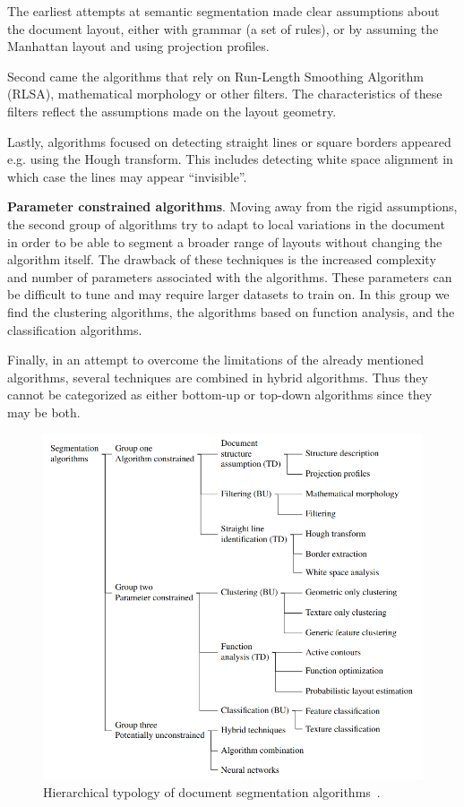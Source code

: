 \documentclass[english, bibtex]{kththesis}
\begin{document}
The earliest attempts at semantic segmentation made clear assumptions about the document layout, either with grammar (a set of rules), or by assuming the Manhattan layout and using projection profiles.
    
Second came the algorithms that rely on Run-Length Smoothing Algorithm (RLSA), mathematical morphology or other filters. The characteristics of these filters reflect the assumptions made on the layout geometry. 
    
Lastly, algorithms focused on detecting straight lines or square borders appeared e.g. using the Hough transform. This includes detecting white space alignment in which case the lines may appear “invisible”.
    
\textbf{Parameter constrained algorithms}. Moving away from the rigid assumptions, the second group of algorithms try to adapt to local variations in the document in order to be able to segment a broader range of layouts without changing the algorithm itself. The drawback of these techniques is the increased complexity and number of parameters associated with the algorithms. These parameters can be difficult to tune and may require larger datasets to train on. In this group we find the clustering algorithms, the algorithms based on function analysis, and the classification algorithms. 

Finally, in an attempt to overcome the limitations of the already mentioned algorithms, several techniques are combined in hybrid algorithms. Thus they cannot be categorized as either bottom-up or top-down algorithms since they may be both.  

\begin{figure}[H]
  \begin{center}
    \includegraphics[width=1.0\textwidth]{figures/classicalalgs.png}
  \end{center}
  \caption{Hierarchical typology of document segmentation algorithms~\cite{ESKENAZI20171}.   }
  \label{fig:classicalgs}
\end{figure}
\end{document}
